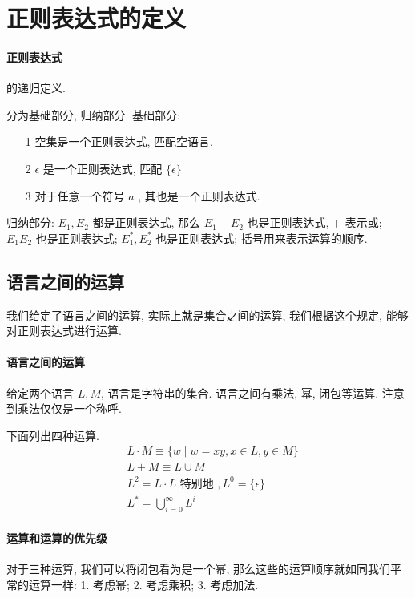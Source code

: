 \documentclass[../main_part1.tex]{subfiles}
\begin{document}
\section{正则表达式的定义}%
\paragraph{正则表达式} 的递归定义. 
\begin{definition}
分为基础部分, 归纳部分. 基础部分:
\begin{itemize}
\item [1] 
空集是一个正则表达式, 匹配空语言. 
\item [2] \(\epsilon\) 是一个正则表达式, 匹配 \(\{ \epsilon \}\)
\item [3] 对于任意一个符号 \(a\) , 其也是一个正则表达式. 
\end{itemize}
归纳部分: \(E_{1}, E_{2}\) 都是正则表达式, 那么 \(E_{1} + E_{2}\) 也是正则表达式,  \(+\) 表示或; \(E_{1} E_{2} \) 也是正则表达式; \(E_{1} ^{*}, E_{2} ^{*}\) 也是正则表达式; 括号用来表示运算的顺序. 
\end{definition}

\subsection{语言之间的运算}
我们给定了语言之间的运算, 实际上就是集合之间的运算, 我们根据这个规定, 能够对正则表达式进行运算. 
\paragraph{语言之间的运算}
给定两个语言 \(L, M\), 语言是字符串的集合. 语言之间有乘法, 幂, 闭包等运算. 注意到乘法仅仅是一个称呼. 
\begin{definition}[运算] 下面列出四种运算. \\ 
\[
\begin{aligned}
& L \cdot M \equiv \{ w \mid w = xy , x \in L , y \in M\} \\
& L + M \equiv L \cup M \\
& L^{2} = L \cdot L \text{ 特别地 }, L ^{0} = \{\epsilon\}\\
& L ^{*} = \bigcup_{i= 0 } ^{\infty} L ^{i}
\end{aligned}
\]
\end{definition}

\paragraph{运算和运算的优先级}
对于三种运算, 我们可以将闭包看为是一个幂, 那么这些的运算顺序就如同我们平常的运算一样: 1. 考虑幂; 2. 考虑乘积; 3. 考虑加法.
\end{document}
